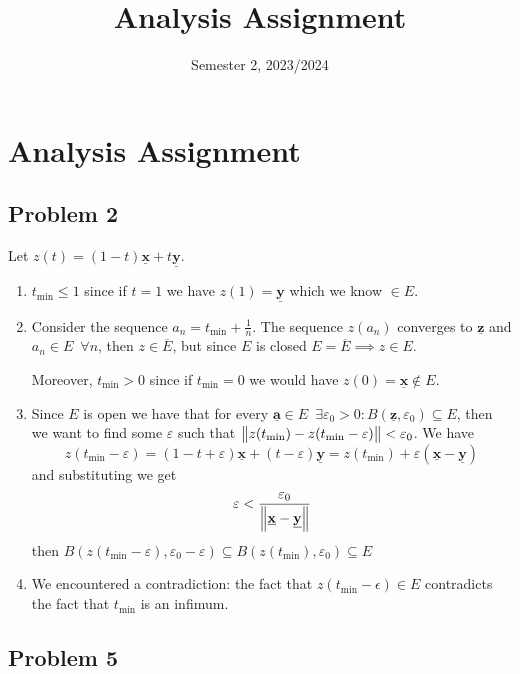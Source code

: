 \documentclass[12pt]{extarticle}
\title{Analysis Assignment}
\date{Semester 2, 2023/2024}
\renewcommand{\vec}[1]{\underline{\mathbf{#1}}}
\newcommand{\tmin}{t_{\text{min}}}
\begin{document}
\section*{Analysis Assignment}

\subsection*{Problem 2}

Let $z(t) = (1-t) \vec x + t \vec y$.

\begin{enumerate}[label=\alph*.]
    \item $t_{\text{min}} \leq 1$ since if $t = 1$ we have $z(1) = \vec{y}$ which we know $\in E$.
    \item Consider the sequence $a_n = t_{\text{min}} + \frac{1}{n}$. The sequence $z(a_n)$ converges to $\vec z$ and $a_n \in E \enspace \forall n$, then $z \in \overline{E}$, but since $E$ is closed $E = \overline{E} \implies z \in E$.

          Moreover, $\tmin > 0$ since if $\tmin = 0$ we would have $z(0) = \vec x \notin E$.
    \item Since $E$ is open we have that for every $\vec a \in E \enspace \exists \varepsilon_0 > 0 : B(\vec z, \varepsilon_0) \subseteq E$, then we want to find some $\varepsilon$ such that $\norm {z(\tmin) - z(\tmin- \varepsilon)} < \varepsilon_0$.
          We have
          $$
              z(\tmin - \varepsilon) = (1 - t +\varepsilon)\vec x + (t-\varepsilon)\vec y = z(\tmin) + \varepsilon(\vec x - \vec y)
          $$
          and substituting we get
          $$
              \varepsilon < \frac{\varepsilon_0}{\norm{\vec x - \vec y}}
          $$
          then $B(z(\tmin - \varepsilon), \varepsilon_0 - \varepsilon) \subseteq B(z(\tmin), \varepsilon_0) \subseteq E$

    \item We encountered a contradiction: the fact that $z(\tmin - \epsilon) \in E$ contradicts the fact that $\tmin$ is an infimum.
\end{enumerate}

\subsection*{Problem 5}
\end{document}
